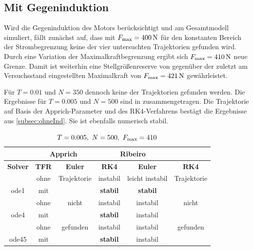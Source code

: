 \subsection{Mit Gegeninduktion}

Wird die Gegeninduktion des Motors berücksichtigt und am Gesamtmodell simuliert, fällt zunächst auf, dass mit $F_{\mathrm{max}}= 400\,\mathrm{N}$ für den konstanten Bereich der Strombegrenzung keine der vier untersuchten Trajektorien gefunden wird. Durch eine Variation der Maximalkraftbegrenzung ergibt sich $F_{\mathrm{max}}= 410\,\mathrm{N}$ neue Grenze. Damit ist weiterhin eine Stellgrößenreserve von  gegenüber der zuletzt am Versuchsstand eingestellten Maximalkraft von $F_{\mathrm{max}}= 421\,\mathrm{N}$ gewährleistet. 

Für $T=0.01$ und  $N=350$ dennoch keine der Trajektorien gefunden werden. Die Ergebnisse für $T=0.005$ und $N=500$ sind in  zusammengetragen. Die Trajektorie auf Basis der Apprich-Parameter und des RK4-Verfahrens bestägt die Ergebnisse aus \ref{subsec:ohneInd}. Sie ist ebenfalls numerisch stabil.

\begin{table}[htbp]
	\centering
		\begin{tabular}{c|c|c|c|c|c}
			\rowcolor[gray]{0.9}
			\multicolumn{2}{c|}{\textbf{Simulation}} & \multicolumn{2}{c|}{\textbf{Apprich}} & \multicolumn{2}{c}{\textbf{Ribeiro}} \\
			\midrule
			\rowcolor[gray]{0.9}
			\textbf{Solver} & \textbf{TFR} & \textbf{Euler} & \textbf{RK4} & \textbf{Euler} & \textbf{RK4} \\
			\midrule
			\cellcolor[gray]{0.9}  											& \cellcolor[gray]{.9}ohne & Trajektorie  & instabil & leicht instabil & Trajektorie\\
			\multirow{-2}{*}{\cellcolor[gray]{.9}ode1}	& \cellcolor[gray]{.9}mit  &   						& \textbf{stabil} & \textbf{stabil} 				 & 	\\
			\midrule		
			\cellcolor[gray]{0.9}  											& \cellcolor[gray]{.9}ohne & nicht	& instabil 						& instabil & nicht\\
			\multirow{-2}{*}{\cellcolor[gray]{.9}ode4}	& \cellcolor[gray]{.9}mit  &        & \textbf{stabil}   	& instabil & \\
			\midrule	
			\cellcolor[gray]{0.9}  											& \cellcolor[gray]{.9}ohne & gefunden 	&  instabil    			& instabil 	& gefunden\\
			\multirow{-2}{*}{\cellcolor[gray]{.9}ode45}	& \cellcolor[gray]{.9}mit  &  					&  \textbf{stabil}  & instabil 	& \\																											
		\end{tabular}
	\caption{$T=0.005, \ N=500, \ F_{\mrm{max}}=410$}
	\label{tab:T001N350Fmax400}
\end{table}

